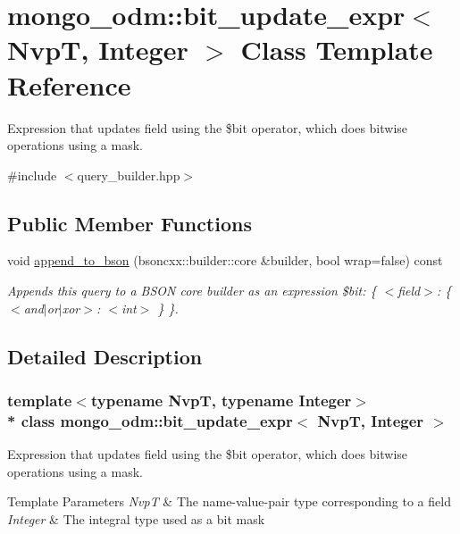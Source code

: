 \hypertarget{classmongo__odm_1_1bit__update__expr}{}\section{mongo\+\_\+odm\+:\+:bit\+\_\+update\+\_\+expr$<$ NvpT, Integer $>$ Class Template Reference}
\label{classmongo__odm_1_1bit__update__expr}


Expression that updates field using the \$bit operator, which does bitwise operations using a mask.  




{\ttfamily \#include $<$query\+\_\+builder.\+hpp$>$}

\subsection*{Public Member Functions}
\begin{DoxyCompactItemize}
\item 
void \hyperlink{classmongo__odm_1_1bit__update__expr_a3376a71ac3c15a2ea7ac0e297e5bd59d}{append\+\_\+to\+\_\+bson} (bsoncxx\+::builder\+::core \&builder, bool wrap=false) const 
\begin{DoxyCompactList}\small\item\em Appends this query to a B\+S\+ON core builder as an expression \textquotesingle{}\$bit\+: \{ $<$field$>$\+: \{ $<$and$\vert$or$\vert$xor$>$\+: $<$int$>$ \} \}\textquotesingle{}. \end{DoxyCompactList}\end{DoxyCompactItemize}


\subsection{Detailed Description}
\subsubsection*{template$<$typename NvpT, typename Integer$>$\\*
class mongo\+\_\+odm\+::bit\+\_\+update\+\_\+expr$<$ Nvp\+T, Integer $>$}

Expression that updates field using the \$bit operator, which does bitwise operations using a mask. 


\begin{DoxyTemplParams}{Template Parameters}
{\em NvpT} & The name-\/value-\/pair type corresponding to a field \\
\hline
{\em Integer} & The integral type used as a bit mask \\
\hline
\end{DoxyTemplParams}


